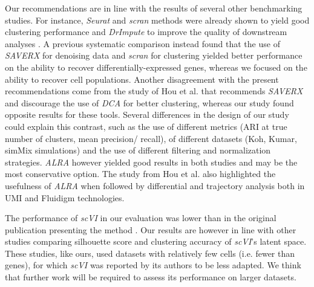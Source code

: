 \documentclass{bmcart}
\begin{document}
Our recommendations are in line with the results of several other benchmarking studies. For instance, \textit{Seurat} and \textit{scran} methods were already shown to yield good clustering performance \cite{freytagComparison2018} and \textit{DrImpute} to improve the quality of downstream analyses \cite{ZhangImput2018}. A previous systematic comparison \cite{viethSystematic2019} instead found that the use of \textit{SAVERX} for denoising data and \textit{scran} for clustering yielded better performance on the ability to recover differentially-expressed genes, whereas we focused on the ability to recover cell populations. Another disagreement with the present recommendations come from the study of Hou et al. \cite{HouImput2020} that recommends \textit{SAVERX} and discourage the use of \textit{DCA} for better clustering, whereas our study found opposite results for these tools. Several differences in the design of our study could explain this contrast, such as the use of different metrics (ARI at true number of clusters, mean precision/ recall), of different datasets (Koh, Kumar, simMix simulations) and the use of different filtering and normalization strategies. \textit{ALRA} however yielded good results in both studies and may be the most conservative option. The study from Hou et al. also highlighted the usefulness of \textit{ALRA} when followed by differential and trajectory analysis both in UMI and Fluidigm technologies.

The performance of \textit{scVI} in our evaluation was lower than in the original publication presenting the method \cite{lopezDeep2018}. Our results are however in line with other studies comparing silhouette score \cite{Aparicio2020} and clustering accuracy \cite{HouImput2020} of \textit{scVI}'s latent space. These studies, like ours, used datasets with relatively few cells (i.e. fewer than genes), for which \textit{scVI} was reported by its authors to be less adapted. We think that further work will be required to assess its performance on larger datasets.
\end{document}
